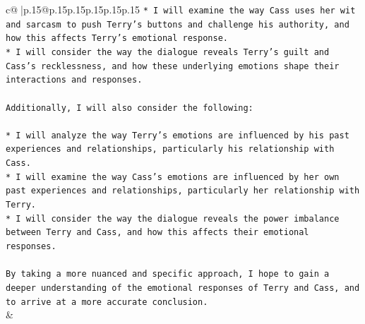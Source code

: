 \documentclass{article}
\begin{document}
{\begin{supertabular}{c@{$\;$}|p{.15\linewidth}@{}p{.15\linewidth}p{.15\linewidth}p{.15\linewidth}p{.15\linewidth}p{.15\linewidth}}
{{{\texttt{* I will examine the way Cass uses her wit and sarcasm to push Terry's buttons and challenge his authority, and how this affects Terry's emotional response.} \\
\texttt{* I will consider the way the dialogue reveals Terry's guilt and Cass's recklessness, and how these underlying emotions shape their interactions and responses.} \\
\\ 
\texttt{Additionally, I will also consider the following:} \\
\\ 
\texttt{* I will analyze the way Terry's emotions are influenced by his past experiences and relationships, particularly his relationship with Cass.} \\
\texttt{* I will examine the way Cass's emotions are influenced by her own past experiences and relationships, particularly her relationship with Terry.} \\
\texttt{* I will consider the way the dialogue reveals the power imbalance between Terry and Cass, and how this affects their emotional responses.} \\
\\ 
\texttt{By taking a more nuanced and specific approach, I hope to gain a deeper understanding of the emotional responses of Terry and Cass, and to arrive at a more accurate conclusion.} \\
            }
        }
    }
    & \\ \\

\end{supertabular}
}
\end{document}
